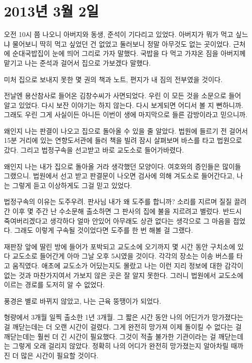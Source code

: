 \begin{article}
\hypertarget{uxb144-3uxc6d4-2uxc77c}{%
\chapter{2013년 3월 2일}\label{uxb144-3uxc6d4-2uxc77c}}

오전 10시 쯤 나오니 아버지와 동생, 준석이 기다리고 있었다. 아버지가 뭐가 먹고 싶느냐 물어보니 딱히 먹고 싶었던 건 없었고 둘러보니 정말 아무것도 없는 곳이었다. 근처에 순대국밥집이 눈에 띄어 그리로 가자 말했다. 국밥을 다 먹고 가쟈온 짐을 아버지께 맡기고 나는 준석과 걸어서 집으로 가보겠다 말했다.

미처 집으로 보내지 못한 몇 권의 책과 노트, 편지가 내 짐의 전부였을 것이다.

전날엔 용산참사로 들어온 김창수씨가 사면되었다. 우린 이 모든 것을 소문으로 들어 알고 있었다. 다시 보잔 이야기는 하지 않는다. 다시 보게되면 어디서 볼 지 뻔하니까. 그래도 우린 그게 사실이든 아니든 이번이 생에 마지막으로 들른 감방이라고 믿으니까.

왜인지 나는 판결이 나오고 집으로 돌아올 수 있을 줄 알았다. 법원에 들르기 전 걸어서 15분 거리에 있는 연향도서관에 들러 책을 빌려 잠시 살펴보며 바스를 타고 법원으로 갔다. 그리고 법정구속을 선고받고 바로 교도소로 들어가바렸다.

왜인지 나는 내가 집으로 돌아올 거라 생각했던 모양이다. 여호와의 증인들은 많이들 그랬으니. 법원에서 선고 받고 판결문이 나오면 검사에 의해 겨도소로 들어간다고, 나는 그렇게 듣고 이상하게도 그걸 믿고 있었다.

법정구속의 이유는 도주우려. 판사님 내가 왜 도주를 합니까? 소리를 지르며 질질 끌려간 이후 몇 주간 난 수소문해 출소하면 그 판사의 집에 불을 지르려고 별렀다. 반드시 죽여버리겠다고 생각하다 얼마 안있어 아무래도 상관 없다는 생각으로 그 마음을 접었다. 그래도 이렇게 구속될 것이었다면 도주를 한 번 해볼 걸 그랬다.

재판장 앞에 딸린 방에 들어가 포박되고 교도소에 오기까지 몇 시간 동안 구치소에 있다 교도소로 들어간게 아마 그날 오후 5시였을 것이다. 각각의 장소는 이송 버스를 타고 움직였다. 애초에 교도소가 어딨는지도 몰랐고 나는 이런 지리 정보에 대한 감각이 없는 것과 마찬가지여서 가보지 않은 곳은 잘 알지 못한다. 그러니 법원에서 교도소에 이르는 경로를 도저히 알 수 없었다.

풍경은 별로 바뀌지 않았고, 나는 근육 뚱땡이가 되었다.

형량에서 3개월 일찍 출소한 1년 3개월. 그 짧은 시간 동안 나의 어딘가가 망가졌다는 걸 깨닫는데는 더 오랜 시간이 걸렸다. 그게 완전히 망가져 이제 돌이킬 수 없다는 걸 깨닫는데는 훨씬 더 긴 시간이 필요했다. 그것이 적출 불가한 기관이라는 걸 깨닫는데는 그렇게 오래 걸리지 않았다. 정확히 나의 어디가 완전히 망가졌는지 알아차릴 때까진 더 많은 시간이 필요할 것이다.


\end{article}
